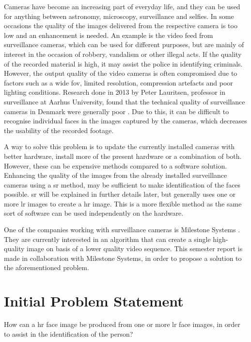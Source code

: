 % 
%


Cameras have become an increasing part of everyday life, and they can be used for anything between astronomy, microscopy, surveillance and selfies. In some occasions the quality of the images delivered from the respective camera is too low and an enhancement is needed. An example is the video feed from surveillance cameras, which can be used for different purposes, but are mainly of interest in the occasion of robbery, vandalism or other illegal acts. If the quality of the recorded material is high, it may assist the police in identifying criminals. However, the output quality of the video cameras is often compromised due to factors such as a wide \gls{fov}, limited resolution, compression artefacts and poor lighting conditions. Research done in 2013 by Peter Lauritsen, professor in surveillance at Aarhus University, found that the technical quality of surveillance cameras in Denmark were generally poor \cite{ing-cam}. Due to this, it can be difficult to recognise individual faces in the images captured by the cameras, which decreases the usability of the recorded footage.

A way to solve this problem is to update the currently installed cameras with better hardware, install more of the present hardware or a combination of both. However, these can be expensive methods compared to a software solution. Enhancing the quality of the images from the already installed surveillance cameras using a \gls{sr} method, may be sufficient to make identification of the faces possible. \gls{sr} will be explained in further details later, but generally uses one or more \gls{lr} images to create a \gls{hr} image. This is a more flexible method as the same sort of software can be used independently on the hardware. 

One of the companies working with surveillance cameras is Milestone Systems \cite{milestone}. They are currently interested in an algorithm that can create a single high-quality image on basis of a lower quality video sequence. This semester report is made in collaboration with Milestone Systems, in order to propose a solution to the aforementioned problem.

\section{Initial Problem Statement}
How can a \gls{hr} face image be produced from one or more \gls{lr} face images, in order to assist in the identification of the person?
